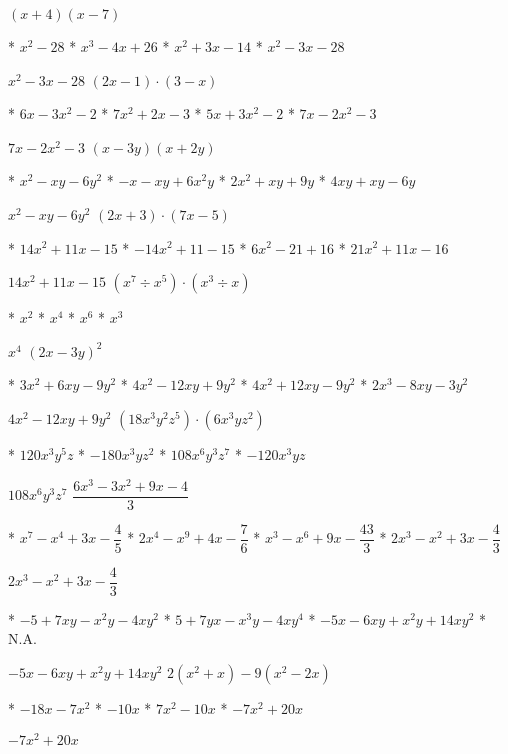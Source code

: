 $(x+4)(x-7)$
\begin{enum}
  * $x^2-28$
  * $x^3-4x+26$
  * $x^2+3x-14$
  * $x^2-3x-28$
\end{enum}
$x^2-3x-28$
$(2x-1)\cdot(3-x)$
\begin{enum}
  * $6x-3x^2-2$
  * $7x^2+2x-3$
  * $5x+3x^2-2$
  * $7x-2x^2-3$
\end{enum}
$7x-2x^2-3$
$(x-3y)(x+2y)$
\begin{enum}
  * $x^2-xy-6y^2$
  * $-x-xy+6x^2y$
  * $2x^2+xy+9y$
  * $4xy+xy-6y$
\end{enum}
$x^2-xy-6y^2$
$(2x+3)\cdot(7x-5)$
\begin{enum}
  * $14x^2+11x-15$
  * $-14x^2+11-15$
  * $6x^2-21+16$
  * $21x^2+11x-16$
\end{enum}
$14x^2+11x-15$
$\left(x^7\div x^5\right)\cdot\left(x^3\div x\right)$
\begin{enum}
  * $x^2$
  * $x^4$
  * $x^6$
  * $x^3$
\end{enum}
$x^4$
$(2x-3y)^2$
\begin{enum}
  * $3x^2+6xy-9y^2$
  * $4x^2-12xy+9y^2$
  * $4x^2+12xy-9y^2$
  * $2x^3-8xy-3y^2$
\end{enum}
$4x^2-12xy+9y^2$
$\left(18x^3y^2z^5\right)\cdot\left(6x^3yz^2\right)$
\begin{enum}
  * $120x^3y^5z$
  * $-180x^3yz^2$
  * $108x^6y^3z^7$
  * $-120x^3yz$
\end{enum}
$108x^6y^3z^7$
$\dfrac{6x^3-3x^2+9x-4}{3}$
\begin{enum}
  * $x^7-x^4+3x-\dfrac{4}{5}$
  * $2x^4-x^9+4x-\dfrac{7}{6}$
  * $x^3-x^6+9x-\dfrac{43}{3}$
  * $2x^3-x^2+3x-\dfrac{4}{3}$
\end{enum}
$2x^3-x^2+3x-\dfrac{4}{3}$
\begin{enum}
  * $-5+7xy-x^2y-4xy^2$
  * $5+7yx-x^3y-4xy^4$
  * $-5x-6xy+x^2y+14xy^2$
  * N.A.
\end{enum}
$-5x-6xy+x^2y+14xy^2$
$2\left(x^2+x\right)-9\left(x^2-2x\right)$
\begin{enum}
  * $-18x-7x^2$
  * $-10x$
  * $7x^2-10x$
  * $-7x^2+20x$
\end{enum}
$-7x^2+20x$
